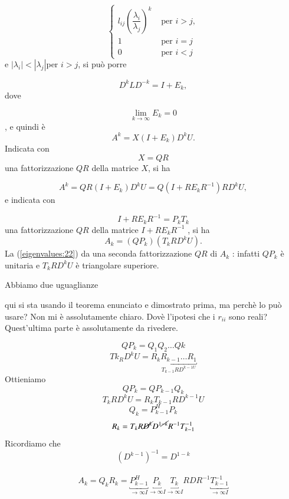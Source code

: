 \begin{thproof}
\begin{enumerate}
\begin{equation}
\label{eigenvalues:20}
  \left\{
 \begin{array}{ll}
  l_{ij}\left(\dfrac{\lambda_i}{\lambda_j} \right)^{k} & \text{ per } i > j, \\
  1 & \text{ per } i =j \\
  0 & \text{ per } i < j
 \end{array}
 \right.
\end{equation}
e $|\lambda_i | < |\lambda_j | $per $i > j$, si pu\`o porre

$$D^k LD^{-k} = I + E_k,$$
dove

$$\lim_{k \to \infty} E_k = 0$$,
e quindi \`e
$$A^k = X(I + E_k )D^k U.$$
Indicata con
$$X = QR$$
una fattorizzazione $QR$ della matrice $X$, si ha

$$A^k = QR(I + E_k )D^k U = Q(I + RE_k R^{-1} )RD^k U,$$
e indicata con

\begin{equation}
\label{eigenvalues:21}
I + RE_k R^{-1} = P_k T_k
\end{equation}
una fattorizzazione $QR$ della matrice $I + RE_k R^{-1}$ , si ha
\begin{equation}
\label{eigenvalues:22}
A_k = (QP_k ) (T_k RD^k U ).
\end{equation}
La (\ref{eigenvalues:22}) da una seconda fattorizzazione $QR$ di $A_k$ :
infatti $QP_k$ \`e unitaria e $T_k RD^{k} U$ \`e triangolare superiore.
\end{enumerate}
Abbiamo due uguaglianze
\begin{openquestion}
qui si sta usando il teorema enunciato e dimostrato prima, ma perch\`e
lo pu\`o usare? Non mi \`e assolutamente chiaro. Dov\`e l'ipotesi che
i $r_{ii}$ sono reali? Quest'ultima parte \`e assolutamente da rivedere.
\end{openquestion}


$$ QP_k = Q_1 Q_2 \ldots Qk$$
$$ Tk_RD^{k} U = R_{k} \underbracket{R_{k-1} \ldots R_1}_{T_{k-1} RD^{k-1U}} $$
Ottieniamo
$$ QP_{k}= QP_{k-1} Q_k$$
$$ T_k RD^{k} U  = R_{k} T_{k-1} RD^{k-1} U$$
$$ Q_k = P_{k-1}^{H} P_k$$
$$ R_{k} = T_k R \cancel{D^{k}} D^{1\cancel{-k}} R^{-1} T^{-1}_{k-1}$$
Ricordiamo che
$$ (D^{k-1})^{-1}= D^{1-k}$$
\\
$$ A_k = Q_k R_k =
 \underbracket{P^{H}_{k-1}}_{\to \infty I}
\underbracket{P_{k}}_{\to \infty I}
\underbracket{ T_{k}}_{\to \infty I} RDR^{-1}
\underbracket{ T_{k-1}^{-1}}_{\to \infty I}
$$
\end{thproof}
